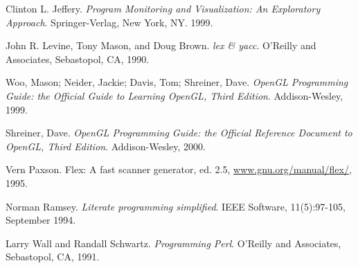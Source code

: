 \begin{thebibliography}{ABCD}
   Clinton L. Jeffery.
    \emph{Program Monitoring and Visualization: An Exploratory Approach}.
    Springer-Verlag, New York, NY. 1999.

   John R. Levine, Tony Mason, and Doug Brown.
    \emph{lex \& yacc}. O'Reilly and Associates, Sebastopol, CA, 1990.

   Woo, Mason; Neider, Jackie; Davis, Tom; Shreiner, Dave.
    \emph{OpenGL Programming Guide: the Official Guide to Learning OpenGL, Third
      Edition}. Addison-Wesley, 1999.

   Shreiner, Dave.
   \emph{OpenGL Programming Guide: the Official
    Reference Document to OpenGL, Third Edition}.  Addison-Wesley, 2000.

   Vern Paxson. {Flex: A fast scanner generator, ed. 2.5},
    \url{www.gnu.org/manual/flex/}, 1995.

   Norman Ramsey. \emph{Literate programming simplified}.
    IEEE Software, 11(5):97-105, September 1994.

   Larry Wall and Randall Schwartz. \emph{Programming
    Perl}.  O'Reilly and Associates, Sebastopol, CA, 1991.

\end{thebibliography}
